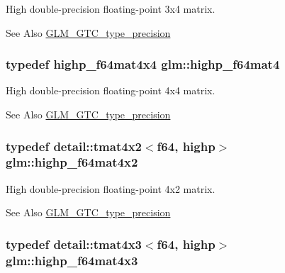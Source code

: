 High double-\/precision floating-\/point 3x4 matrix. \begin{DoxySeeAlso}{See Also}
\hyperlink{group__gtc__type__precision}{G\-L\-M\-\_\-\-G\-T\-C\-\_\-type\-\_\-precision} 
\end{DoxySeeAlso}
\hypertarget{group__gtc__type__precision_ga1ac5d0564721a22765c68c54a0a4f87a}{
\subsubsection[{highp\-\_\-f64mat4}]{\setlength{\rightskip}{0pt plus 5cm}typedef highp\-\_\-f64mat4x4 {\bf glm\-::highp\-\_\-f64mat4}}}\label{group__gtc__type__precision_ga1ac5d0564721a22765c68c54a0a4f87a}
High double-\/precision floating-\/point 4x4 matrix. \begin{DoxySeeAlso}{See Also}
\hyperlink{group__gtc__type__precision}{G\-L\-M\-\_\-\-G\-T\-C\-\_\-type\-\_\-precision} 
\end{DoxySeeAlso}
\hypertarget{group__gtc__type__precision_gabe9bc3680e7d83a7b34297da518a8117}{
\subsubsection[{highp\-\_\-f64mat4x2}]{\setlength{\rightskip}{0pt plus 5cm}typedef detail\-::tmat4x2$<$f64, highp$>$ {\bf glm\-::highp\-\_\-f64mat4x2}}}\label{group__gtc__type__precision_gabe9bc3680e7d83a7b34297da518a8117}
High double-\/precision floating-\/point 4x2 matrix. \begin{DoxySeeAlso}{See Also}
\hyperlink{group__gtc__type__precision}{G\-L\-M\-\_\-\-G\-T\-C\-\_\-type\-\_\-precision} 
\end{DoxySeeAlso}
\hypertarget{group__gtc__type__precision_ga0264562b4667b8073b7708efc2280691}{
\subsubsection[{highp\-\_\-f64mat4x3}]{\setlength{\rightskip}{0pt plus 5cm}typedef detail\-::tmat4x3$<$f64, highp$>$ {\bf glm\-::highp\-\_\-f64mat4x3}}}\label{group__gtc__type__precision_ga0264562b4667b8073b7708efc2280691}
